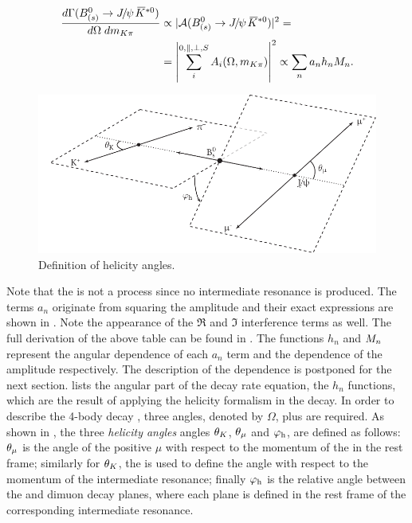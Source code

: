 \begin{align}
  \centering
  \frac{d\Gamma(\text{\BJpsiKst})}{d\Omega\;d\mkpi} &\propto |\mathcal{A}(\text{\BJpsiKst})|^2 = \nonumber \\
                                                    &= \left| \sum_i^{0,\parallel,\perp,S} A_i(\Omega,\mkpi) \right|^2  \propto \sum_n a_n h_n \mKpiAmp.
  \label{ang_terms}
\end{align}

\begin{figure}[t]
  \centering
  \includegraphics[width=\textwidth]{Figures/Chapter4/helAngles}
  \caption{Definition of helicity angles.}
  \label{helAngles}
\end{figure}

\noindent Note that the \swave is not a \PtoVV process since no intermediate \Kstarz resonance is produced.
 The terms $a_n$ originate from squaring the amplitude and their exact expressions are shown in .
Note the appearance of the $\Re$ and $\Im$ interference terms as well. The full derivation of the above table can be found in \cite{jeroenThesis}.
The functions $h_n$ and $M_{n}$ represent the angular dependence of each $a_n$ term and the \mkpi
dependence of the amplitude respectively. The description of the \mkpi dependence is postponed for the next section. 
lists the angular part of the decay rate equation, \ie the $h_n$ functions, which are the result of
applying the helicity formalism in the \BJpsiKst decay. In order to describe the 4-body decay \BJpsiKst, three
angles, denoted by $\Omega$, plus \mkpi are required. As shown in , the three \emph{helicity angles} angles
$\theta_{K}$, $\theta_{\mu}$ and $\varphi_{\rm h}$, are defined as follows: $\theta_{\mu}$ is the angle of the positive $\mu$ with respect to the
momentum of the \jpsi in the \Bs rest frame; similarly for $\theta_{K}$, the \kaon is used to define the angle with respect to
the momentum of the intermediate \Kpi resonance; finally $\varphi_{\rm h}$ is the relative angle between the \Kpi and dimuon decay
planes, where each plane is defined in the rest frame of the corresponding intermediate resonance.

